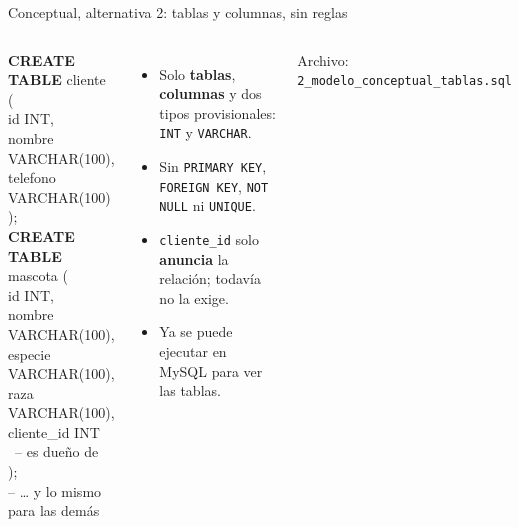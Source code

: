 \documentclass[aspectratio=169,10pt,c]{beamer}
\newcommand{\kw}[1]{\textcolor{utpRojo}{\textbf{#1}}}
\newcommand{\com}[1]{\textcolor{utpGris}{-- #1}}
\newenvironment{sqlcode}[1][.86\textwidth]
  {\begin{center}\begin{lrbox}{\sqlbuf}\begin{minipage}{#1}\ttfamily\footnotesize\vspace{6pt}\raggedright}
  {\vspace{6pt}\end{minipage}\end{lrbox}\colorbox{utpGrisClaro}{\usebox{\sqlbuf}}\end{center}}
\newcommand{\ind}{\hspace*{1.6em}}
\begin{document}
\begin{frame}{Conceptual, alternativa 2: tablas y columnas, sin reglas}
\begin{columns}[c,onlytextwidth]
\begin{sqlcode}[\dimexpr\textwidth-2\fboxsep\relax]
\scriptsize
\kw{CREATE TABLE} cliente (\\
\ind id INT,\\
\ind nombre VARCHAR(100),\\
\ind telefono VARCHAR(100)\\
);\\[4pt]
\kw{CREATE TABLE} mascota (\\
\ind id INT,\\
\ind nombre VARCHAR(100),\\
\ind especie VARCHAR(100),\\
\ind raza VARCHAR(100),\\
\ind cliente\_id INT \ \com{es dueño de}\\
);\\
\com{\ldots{} y lo mismo para las demás}
\end{sqlcode}
\small
\begin{itemize}\setlength\itemsep{6pt}
  \item Solo \textbf{tablas}, \textbf{columnas} y dos tipos provisionales: \texttt{INT} y \texttt{VARCHAR}.
  \item Sin \texttt{PRIMARY KEY}, \texttt{FOREIGN KEY}, \texttt{NOT NULL} ni \texttt{UNIQUE}.
  \item \texttt{cliente\_id} solo \textbf{anuncia} la relación; todavía no la exige.
  \item Ya se puede ejecutar en MySQL para ver las tablas.
\end{itemize}
\vspace{0.15cm}
\footnotesize\color{utpGris} Archivo: \texttt{2\_modelo\_conceptual\_tablas.sql}
\end{columns}
\end{frame}
\end{document}
